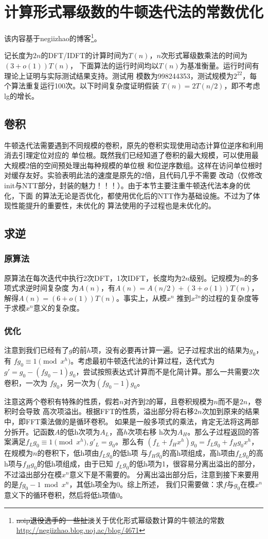 \section{计算形式幂级数的牛顿迭代法的常数优化}
该内容基于negiizhao的博客\footnote{
    \sout{noip退役选手的一些扯淡}关于优化形式幂级数计算的牛顿法的常数\\
    \url{http://negiizhao.blog.uoj.ac/blog/4671}
}。

记长度为$2n$的DFT/IDFT的计算时间为$T(n)$，$n$次形式幂级数乘法的时间为$(3+o(1))T(n)$，
下面算法的运行时间均以$T(n)$为基准衡量。运行时间有理论上证明与实际测试结果支持。测试用
模数为998244353，测试规模为$2^{22}$，每个算法重复运行100次。以下时间复杂度证明假装
$T(n)=2T(n/2)$，即不考虑lg的增长。

\subsection{卷积}
牛顿迭代法需要遇到不同规模的卷积，原先的卷积实现使用动态计算位逆序和利用消去引理定位对应的
单位根。既然我们已经知道了卷积的最大规模，可以使用最大规模2倍的空间预处理出每种规模的单位根
和位逆序数组。这样在访问单位根时对缓存友好。实验表明此法的速度是原先的2倍，且代码几乎不需要
改动（仅修改init与NTT部分，封装的魅力！！！）。由于本节主要注重牛顿迭代法本身的优化，下面
的算法无论是否优化，都使用优化后的NTT作为基础设施。不过为了体现性能提升的重要性，未优化的
算法使用的子过程也是未优化的。
\subsection{求逆}
\subsubsection{原算法}
原算法在每次迭代中执行2次DFT，1次IDFT，长度均为$2n$级别。记规模为$n$的多项式求逆时间复杂度
为$A(n)$，有$A(n)=A(n/2)+(3+o(1))T(n)$，解得$A(n)=(6+o(1))T(n)$。事实上，从模$x^n$
推到$x^{2n}$的过程的复杂度等于求模$x^n$意义的复杂度。
\subsubsection{优化}
注意到我们已经有了$g$的前$h$项，没有必要再计算一遍。记子过程求出的结果为$g_0$，有
$fg_0\equiv 1\pmod{x^h}$。考虑最初牛顿迭代法的计算过程，迭代式为
$g'=g_0-(fg_0-1)g_0$，尝试按照表达式计算而不是化简计算。那么一共需要2次卷积，一次为
$fg_0$，另一次为$(fg_0-1)g_0$。

注意这两个卷积有特殊的性质，假若$n$对齐到2的幂，且卷积规模为$n$而不是$2n$，卷积时会导致
高次项溢出。根据FFT的性质，溢出部分将右移$2n$次加到原来的结果中，即FFT乘法做的是循环卷积。
如果是一般多项式的乘法，肯定无法将这两部分拆开。记函数$A$的低h次项为$A_L$，高$h$次项右移
h次为$A_H$。那么子过程返回的答案满足$f_Lg_0\equiv 1\pmod{x^h},g'_L=g_0$。那么有
$(f_L+f_Hx^h)g_0=f_Lg_0+f_Hg_0x^h$，在规模为$n$的卷积下，低h项由$f_Lg_0$的低h项
与$f_Hg_0$的高h项组成，高h项由$f_Lg_0$的高h项与$f_Hg_0$的低h项组成，由于已知
$f_Lg_0$的低h项为1，很容易分离出溢出的部分，不过溢出部分在模$x^n$意义下是不需要的。
分离出溢出部分后，注意到接下来要用的是$fg_0-1 \bmod{x^n}$，其低h项全为0。综上所述，
我们只需要做：求$f$与$g_0$在模$x^n$意义下的循环卷积，然后将低h项值0。

